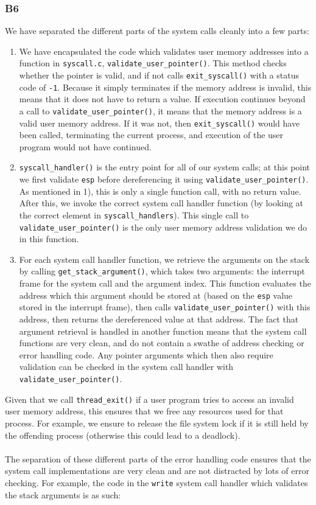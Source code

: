 \documentclass[a4wide, 11pt]{article}
\newcommand{\tx}{\texttt}
\begin{document}
\subsubsection{B6}

We have separated the different parts of the system calls cleanly into a few parts:

\begin{enumerate}
\item We have encapsulated the code which validates user memory addresses into a function in \tx{syscall.c}, \tx{validate\_user\_pointer()}. This method checks whether the pointer is valid, and if not calls \tx{exit\_syscall()} with a status code of \tx{-1}. Because it simply terminates if the memory address is invalid, this means that it does not have to return a value. If execution continues beyond a call to \tx{validate\_user\_pointer()}, it means that the memory address is a valid user memory address. If it was not, then \tx{exit\_syscall()} would have been called, terminating the current process, and execution of the user program would not have continued.
\item \tx{syscall\_handler()} is the entry point for all of our system calls; at this point we first validate \tx{esp} before dereferencing it using \tx{validate\_user\_pointer()}. As mentioned in 1), this is only a single function call, with no return value. After this, we invoke the correct system call handler function (by looking at the correct element in \tx{syscall\_handlers}). This single call to \tx{validate\_user\_pointer()} is the only user memory address validation we do in this function.
\item For each system call handler function, we retrieve the arguments on the stack by calling \tx{get\_stack\_argument()}, which takes two arguments: the interrupt frame for the system call and the argument index. This function evaluates the address which this argument should be stored at (based on the \tx{esp} value stored in the interrupt frame), then calls \tx{validate\_user\_pointer()} with this address, then returns the dereferenced value at that address. The fact that argument retrieval is handled in another function means that the system call functions are very clean, and do not contain a swathe of address checking or error handling code. Any pointer arguments which then also require validation can be checked in the system call handler with \tx{validate\_user\_pointer()}.
\end{enumerate}
Given that we call \tx{thread\_exit()} if a user program tries to access an invalid user memory address, this ensures that we free any resources used for that process. For example, we ensure to release the file system lock if it is still held by the offending process (otherwise this could lead to a deadlock).
\\\\
The separation of these different parts of the error handling code ensures that the system call implementations are very clean and are not distracted by lots of error checking. For example, the code in the \tx{write} system call handler which validates the stack arguments is as such:
\end{document}
